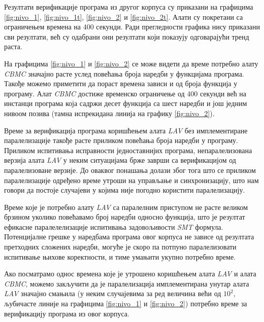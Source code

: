 \documentclass[12pt,oneside]{memoir}
\begin{document}
  Резултати верификације програма из другог корпуса су приказани на графицима \ref{fig:nivo_1}, \ref{fig:nivo_1t}, \ref{fig:nivo_2} и \ref{fig:nivo_2t}. Алати су покретани са ограничењем времена на 400 секунди. Ради прегледности графика нису приказани сви резултати, већ су одабрани они резултати који показују одговарајући тренд раста.
  
  На графицима \ref{fig:nivo_1} и \ref{fig:nivo_2} се може видети да време потребно алату \textit{CBMC} значајно расте услед повећања броја наредби у функцијама програма. Такође можемо приметити да пораст времена зависи и од броја функција у програму. Алат \textit{CBMC} достиже временско ограничење од 400 секунди већ на инстанци програма која садржи десет функција са шест наредби и још једним нивоом позива (тамна испрекидана линија на графику \ref{fig:nivo_2}). 

  Време за верификација програма коришћењем алата \textit{LAV} без имплементиране паралелизације такође расте приликом повећања броја наредби у програму. Приликом испитивања исправности једноставнијих програма, непаралелизована верзија алата \textit{LAV} у неким ситуацијама брже заврши са верификацијом од паралелизоване верзије. До оваквог понашања долази због тога што се приликом паралелизације одређено време утроши на управљање и синхронизацију, што нам говори да постоје случајеви у којима није погодно користити паралелизацију. 
  
  Време које је потребно алату \textit{LAV} са паралелним приступом не расте великом брзином уколико повећавамо број наредби односно функција, што је резултат ефикасне паралелелизације испитивања задовољивости \textit{SMT} формула. Потенцијалне грешке у наредбама програма овог корпуса не зависе од резултата претходних сложених наредби, могуће је скоро па потпуно паралелизовати испитивање њихове коректности, и тиме умањити укупно потребно време. 
  
  Ако посматрамо однос времена које је утрошено коришћењем алата \textit{LAV} и алата \textit{CBMC}, можемо закључити да је паралелизација имплементирана унутар алата \textit{LAV} значајно смањила (у неким случајевима за ред величина већи од $ 10^{2} $, љубичасте линије на графицима \ref{fig:nivo_1} и \ref{fig:nivo_2}) потребно време за верификацију програма из овог корпуса.
  
\end{document}
